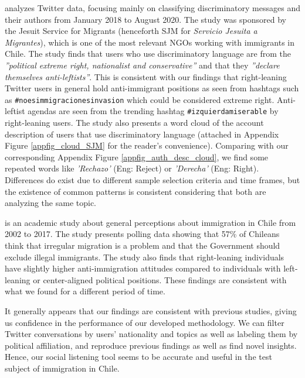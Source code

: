     \cite{glvez_2020_barmetro} analyzes Twitter data, focusing mainly on classifying discriminatory messages and their authors from January 2018 to August 2020. The study was sponsored by the Jesuit Service for Migrants (henceforth SJM for {\it Servicio Jesuita a Migrantes}), which is one of the most relevant NGOs working with immigrants in Chile. The study finds that users who use discriminatory language are from the {\it ''political extreme right, nationalist and conservative''} and that they {\it ''declare themselves anti-leftists''}. This is consistent with our findings that right-leaning Twitter users in general hold anti-immigrant positions as seen from hashtags such as \texttt{\#noesimmigracionesinvasion} which could be considered extreme right. Anti-leftist agendas are seen from the trending hashtag \texttt{\#izquierdamiserable} by right-leaning users. %
    The study also presents a word cloud of the account description of users that use discriminatory language (attached in Appendix Figure \ref{appfig_cloud_SJM} for the reader’s convenience). Comparing with our corresponding Appendix Figure \ref{appfig_auth_desc_cloud}, we find some repeated words like {\it ’Rechazo’} (Eng: Reject) or {\it ’Derecha’} (Eng: Right). Differences do exist due to different sample selection criteria and time frames, but the existence of common patterns is consistent considering that both are analyzing the same topic.
    
    \cite{gonzalez2019como} is an academic study about general perceptions about immigration in Chile from 2002 to 2017. The study presents polling data showing that 57\% of Chileans think that irregular migration is a problem and that the Government should exclude illegal immigrants. The study also finds that right-leaning individuals have slightly higher anti-immigration attitudes compared to individuals with left-leaning or center-aligned political positions. These findings are consistent with what we found for a different period of time. 
    
    It generally appears that our findings are consistent with previous studies, giving us confidence in the performance of our developed methodology. We can filter Twitter conversations by users’ nationality and topics as well as labeling them by political affiliation, and reproduce previous findings as well as find novel insights. Hence, our social listening tool seems to be accurate and useful in the test subject of immigration in Chile.
    
